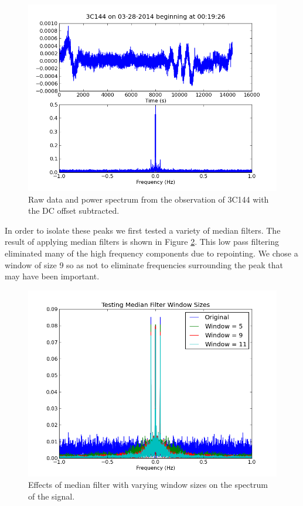 \documentclass{article}
\begin{document}
    \begin{figure}[h!]
    \centering
    \includegraphics[scale=0.5]{img/crab/raw.png}
    \caption{Raw data and power spectrum from the observation of 3C144 with the
    DC offset subtracted.}
    \label{fig:crab_raw}
    \end{figure}

  In order to isolate these peaks we first tested a variety of median filters.
  The result of applying median filters is shown in Figure
  \ref{fig:median_test}. This low pass filtering eliminated many of the high
  frequency components due to repointing. We chose a window of size 9 so as not
  to eliminate frequencies surrounding the peak that may have been important.

    \begin{figure}[h!]
    \centering
    \includegraphics[scale=0.5]{img/crab/median_test.png}
    \caption{Effects of median filter with varying window sizes on the
    spectrum of the signal.}
    \label{fig:median_test}
    \end{figure}
\end{document}
